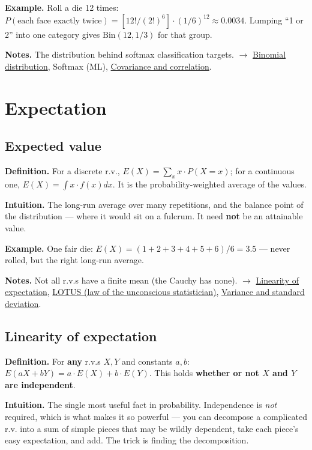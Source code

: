 \documentclass[11pt,a4paper]{article}
\begin{document}
\textbf{Example.} Roll a die 12 times: $P(\text{each face exactly twice}) = [12!/(2!)^{6}]\cdot (1/6)^{12} \approx  0.0034$. Lumping ``1 or 2'' into one category gives $\mathrm{Bin}(12, 1/3)$ for that group.

\textbf{Notes.} The distribution behind softmax classification targets. $\to$ \hyperref[sec:binomial-distribution]{Binomial distribution}, Softmax (ML), \hyperref[sec:covariance-and-correlation]{Covariance and correlation}.


\section{Expectation}

\subsection{Expected value}\label{sec:expected-value}

\textbf{Definition.} For a discrete r.v., $E(X) = \sum _x x\cdot P(X = x)$; for a continuous one, $E(X) = \int  x\cdot f(x) dx$. It is the probability-weighted average of the values.

\textbf{Intuition.} The long-run average over many repetitions, and the balance point of the distribution --- where it would sit on a fulcrum. It need \textbf{not} be an attainable value.

\textbf{Example.} One fair die: $E(X) = (1+2+3+4+5+6)/6 = 3.5$ --- never rolled, but the right long-run average.

\textbf{Notes.} Not all r.v.s have a finite mean (the Cauchy has none). $\to$ \hyperref[sec:linearity-of-expectation]{Linearity of expectation}, \hyperref[sec:lotus-law-of-the-unconscious-statistician]{LOTUS (law of the unconscious statistician)}, \hyperref[sec:variance-and-standard-deviation]{Variance and standard deviation}.

\subsection{Linearity of expectation}\label{sec:linearity-of-expectation}

\textbf{Definition.} For \textbf{any} r.v.s $X, Y$ and constants $a, b$: $E(aX + bY) = a\cdot E(X) + b\cdot E(Y)$. This holds \textbf{whether or not $X$ and $Y$ are independent}.

\textbf{Intuition.} The single most useful fact in probability. Independence is \textit{not} required, which is what makes it so powerful --- you can decompose a complicated r.v. into a sum of simple pieces that may be wildly dependent, take each piece's easy expectation, and add. The trick is finding the decomposition.
\end{document}
